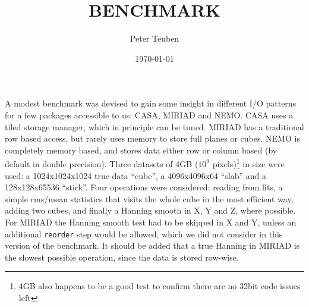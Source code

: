 \documentclass{article}
\title{BENCHMARK}
\author{Peter Teuben}
\date{\today}
\begin{document}
\maketitle


A modest benchmark was devised to gain some insight in different
I/O patterns for a few packages accessible to us: CASA,
MIRIAD and NEMO. CASA uses a tiled storage manager, which in principle
can be tuned. MIRIAD has a traditional row based access, but rarely
uses memory to store full planes or cubes. NEMO is completely
memory based, and stores data either row or column based
(by default in double precision).
Three datasets of 4GB ($10^9$ pixels)\footnote{4GB also happens to
be a good test to confirm there are no 32bit code issues left}
in size were used:
a 1024x1024x1024 true data ``cube'',
a 4096x4096x64 ``slab'' and a 128x128x65536 ``stick''.
Four operations were considered:  reading from fits,
a simple rms/mean statistics that visits the whole cube in the
most efficient way, adding two cubes, and finally
a Hanning smooth in X, Y and Z, where possible.  For MIRIAD
the Hanning smooth test had to be skipped in X and Y, unless
an additional {\tt reorder} step would be allowed, which we did
not consider in this version of the benchmark.
It should be added that a true Hanning in MIRIAD
is the slowest possible operation, since the data is stored
row-wise.
\end{document}
